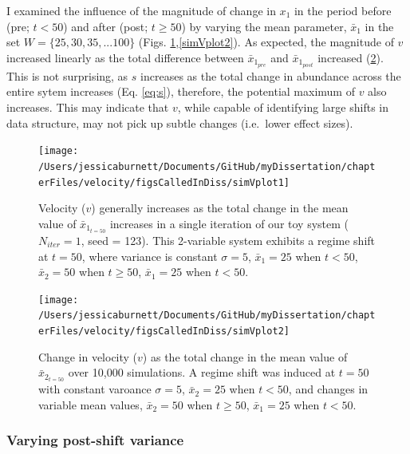 \documentclass[12pt,twoside,openany]{reedthesis}
\begin{document}
I examined the influence of the magnitude of change in \(x_1\) in the period before (pre; \(t <50\)) and after (post; \(t \geq 50\)) by varying the mean parameter, \(\bar{x}_1\) in the set \(W=\{25,30,35,...100 \}\) (Figs. \ref{fig:simVplot1},\ref{simVplot2}). As expected, the magnitude of \(v\) increased linearly as the total difference between \(\bar{x}_{1_{pre}}\) and \(\bar{x}_{1_{post}}\) increased (\ref{fig:simVplot2}). This is not surprising, as \(s\) increases as the total change in abundance across the entire sytem increases (Eq. \eqref{eq:s}), therefore, the potential maximum of \(v\) also increases. This may indicate that \(v\), while capable of identifying large shifts in data structure, may not pick up subtle changes (i.e.~lower effect sizes).
\begin{figure}
\texttt{[image: /Users/jessicaburnett/Documents/GitHub/myDissertation/chapterFiles/velocity/figsCalledInDiss/simVplot1]} \caption{Velocity ($v$) generally increases as the total change in the mean value of $\bar{x}_{1_{t=50}}$ increases in a single iteration of our toy system ($N_{iter}=1$, seed = 123). This 2-variable system exhibits a regime shift at $t=50$, where variance is constant $\sigma = 5$, $\bar{x}_1 = 25$ when $t<50$,  $\bar{x}_2=50$ when $t\geq50$, $\bar{x}_1 = 25$ when $t <50$.}\label{fig:simVplot1}
\end{figure}
\begin{figure}
\texttt{[image: /Users/jessicaburnett/Documents/GitHub/myDissertation/chapterFiles/velocity/figsCalledInDiss/simVplot2]} \caption{Change in velocity ($v$) as the total change in the mean value of $\bar{x}_{2_{t=50}}$ over 10,000 simulations. A regime shift was induced at $t=50$ with constant varoance $\sigma = 5$, $\bar{x}_2 = 25$ when $t<50$,  and changes in variable mean values, $\bar{x}_2 = 50$ when $t \geq 50$, $\bar{x}_1 = 25$ when $t<50$.}\label{fig:simVplot2}
\end{figure}
\hypertarget{varying-post-shift-variance}{%
\subsubsection{Varying post-shift variance}\label{varying-post-shift-variance}}
\end{document}
